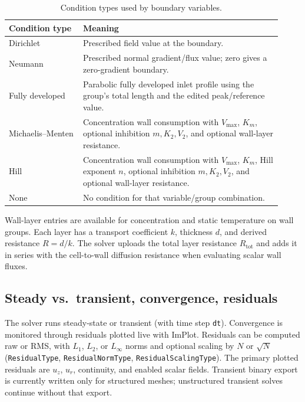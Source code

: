\documentclass[11pt]{article}
\begin{document}
\begin{table}[h]
\centering
\caption{Condition types used by boundary variables.}
\label{tab:bctypes}
\begin{tabular}{@{}>{\raggedright\arraybackslash}p{0.25\linewidth}
                   >{\raggedright\arraybackslash}p{0.67\linewidth}@{}}
\toprule
\textbf{Condition type} & \textbf{Meaning} \\
\midrule
Dirichlet & Prescribed field value at the boundary. \\
Neumann & Prescribed normal gradient/flux value; zero gives a zero-gradient boundary. \\
Fully developed & Parabolic fully developed inlet profile using the group's total length and the edited peak/reference value. \\
Michaelis--Menten & Concentration wall consumption with \(V_{\max}\), \(K_m\), optional inhibition \(m,K_2,V_2\), and optional wall-layer resistance. \\
Hill & Concentration wall consumption with \(V_{\max}\), \(K_m\), Hill exponent \(n\), optional inhibition \(m,K_2,V_2\), and optional wall-layer resistance. \\
None & No condition for that variable/group combination. \\
\bottomrule
\end{tabular}
\end{table}

Wall-layer entries are available for concentration and static temperature on wall
groups. Each layer has a transport coefficient \(k\), thickness \(d\), and derived
resistance \(R=d/k\). The solver uploads the total layer resistance
\(R_{\mathrm{tot}}\) and adds it in series with the cell-to-wall diffusion resistance
when evaluating scalar wall fluxes.

\subsection{Steady vs.\ transient, convergence, residuals}
The solver runs steady-state or transient (with time step \texttt{dt}). Convergence is
monitored through residuals plotted live with ImPlot. Residuals can be computed raw or
RMS, with $L_1$, $L_2$, or $L_\infty$ norms and optional scaling by $N$ or $\sqrt{N}$
(\texttt{ResidualType}, \texttt{ResidualNormType}, \texttt{ResidualScalingType}). The
primary plotted residuals are \(u_z\), \(u_r\), continuity, and enabled scalar fields.
Transient binary export is currently written only for structured meshes; unstructured
transient solves continue without that export.
\end{document}
